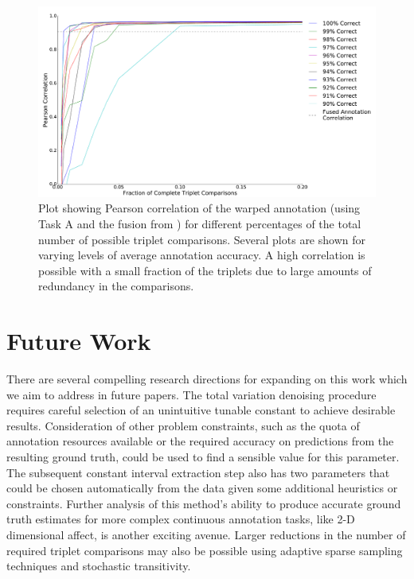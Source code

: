 \documentclass[times,twocolumn,final,authoryear]{elsarticle}
\begin{document}
\begin{figure}
	\centering
	\includegraphics[width=\columnwidth]{images/warp_correlation_robustness}
	\caption{Plot showing Pearson correlation of the warped annotation (using Task A and the fusion from \cite{Mariooryad2015}) for different percentages of the total number of possible triplet comparisons.  Several plots are shown for varying levels of average annotation accuracy.  A high correlation is possible with a small fraction of the triplets due to large amounts of redundancy in the comparisons.}
	\label{fig:warp_correlation_robustness}
\end{figure}

\section{Future Work}
There are several compelling research directions for expanding on this work which we aim to address in future papers.  The total variation denoising procedure requires careful selection of an unintuitive tunable constant to achieve desirable results.  Consideration of other problem constraints, such as the quota of annotation resources available or the required accuracy on predictions from the resulting ground truth, could be used to find a sensible value for this parameter.  The subsequent constant interval extraction step also has two parameters that could be chosen automatically from the data given some additional heuristics or constraints.  Further analysis of this method's ability to produce accurate ground truth estimates for more complex continuous annotation tasks, like 2-D dimensional affect, is another exciting avenue.  Larger reductions in the number of required triplet comparisons may also be possible using adaptive sparse sampling techniques and stochastic transitivity.
\end{document}
